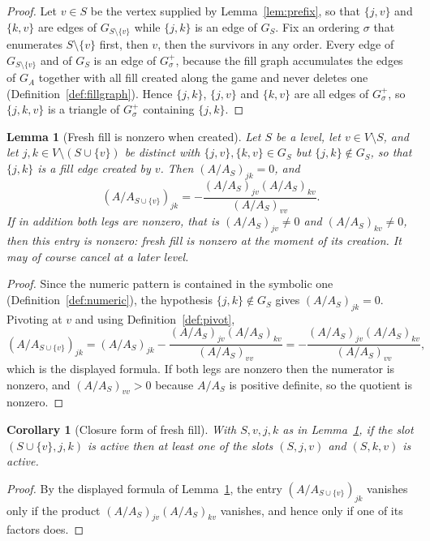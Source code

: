 \documentclass[11pt]{article}
\theoremstyle{plain}
\newtheorem{lemma}[theorem]{Lemma}
\newtheorem{corollary}[theorem]{Corollary}
\theoremstyle{definition}
\begin{document}
\begin{aiblock}
\begin{proof}
Let $v\in S$ be the vertex supplied by Lemma~\ref{lem:prefix}, so that $\{j,v\}$ and $\{k,v\}$ are
edges of $G_{S\setminus\{v\}}$ while $\{j,k\}$ is an edge of $G_S$. Fix an ordering $\sigma$ that
enumerates $S\setminus\{v\}$ first, then $v$, then the survivors in any order. Every edge of
$G_{S\setminus\{v\}}$ and of $G_S$ is an edge of $G^+_\sigma$, because the fill graph accumulates the
edges of $G_A$ together with all fill created along the game and never deletes one
(Definition~\ref{def:fillgraph}). Hence $\{j,k\}$, $\{j,v\}$ and $\{k,v\}$ are all edges of
$G^+_\sigma$, so $\{j,k,v\}$ is a triangle of $G^+_\sigma$ containing $\{j,k\}$.
\end{proof}

\begin{lemma}[Fresh fill is nonzero when created]\label{lem:fresh}
Let $S$ be a level, let $v\in V\setminus S$, and let $j,k\in V\setminus(S\cup\{v\})$ be distinct with
$\{j,v\},\{k,v\}\in G_S$ but $\{j,k\}\notin G_S$, so that $\{j,k\}$ is a fill edge created by $v$.
Then $(A/A_S)_{jk}=0$, and
\[
  (A/A_{S\cup\{v\}})_{jk}=-\frac{(A/A_S)_{jv}(A/A_S)_{kv}}{(A/A_S)_{vv}} .
\]
If in addition both legs are nonzero, that is $(A/A_S)_{jv}\neq0$ and $(A/A_S)_{kv}\neq0$, then this
entry is nonzero: fresh fill is nonzero at the moment of its creation. It may of course cancel at a
later level.
\end{lemma}

\begin{proof}
Since the numeric pattern is contained in the symbolic one (Definition~\ref{def:numeric}), the
hypothesis $\{j,k\}\notin G_S$ gives $(A/A_S)_{jk}=0$. Pivoting at $v$ and using
Definition~\ref{def:pivot},
\[
  (A/A_{S\cup\{v\}})_{jk}=(A/A_S)_{jk}-\frac{(A/A_S)_{jv}(A/A_S)_{kv}}{(A/A_S)_{vv}}
  =-\frac{(A/A_S)_{jv}(A/A_S)_{kv}}{(A/A_S)_{vv}},
\]
which is the displayed formula. If both legs are nonzero then the numerator is nonzero, and
$(A/A_S)_{vv}>0$ because $A/A_S$ is positive definite, so the quotient is nonzero.
\end{proof}

\begin{corollary}[Closure form of fresh fill]\label{cor:fresh-closure}
With $S,v,j,k$ as in Lemma~\ref{lem:fresh}, if the slot $(S\cup\{v\},j,k)$ is active then at least one
of the slots $(S,j,v)$ and $(S,k,v)$ is active.
\end{corollary}

\begin{proof}
By the displayed formula of Lemma~\ref{lem:fresh}, the entry $(A/A_{S\cup\{v\}})_{jk}$ vanishes only
if the product $(A/A_S)_{jv}(A/A_S)_{kv}$ vanishes, and hence only if one of its factors does.
\end{proof}


\end{aiblock}
\end{document}
